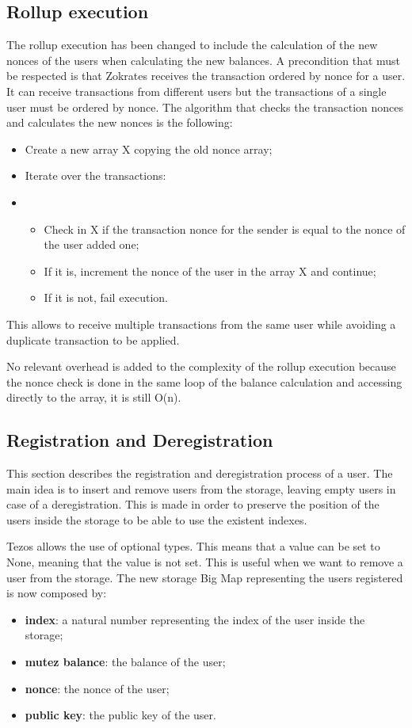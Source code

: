 \subsection{Rollup execution}

The rollup execution has been changed to include the calculation of the new nonces of the users when calculating the new balances.
A precondition that must be respected is that Zokrates receives the transaction ordered by nonce for a user. It can receive transactions from different users but the transactions of a single user must be ordered by nonce. The algorithm that checks the transaction nonces and calculates the new nonces is the following:
\begin{itemize}
	\item Create a new array X copying the old nonce array;
	\item Iterate over the transactions:
	\item \begin{itemize}
		\item Check in X if the transaction nonce for the sender is equal to the nonce of the user added one;
		\item If it is, increment the nonce of the user in the array X and continue;
		\item If it is not, fail execution.
    \end{itemize}
\end{itemize}

This allows to receive multiple transactions from the same user while avoiding a duplicate transaction to be applied.

No relevant overhead is added to the complexity of the rollup execution because the nonce check is done in the same loop of the balance calculation and accessing directly to the array, it is still O(n).



\subsection{Registration and Deregistration}

This section describes the registration and deregistration process of a user. The main idea is to insert and remove users from the storage, leaving empty users in case of a deregistration. This is made in order to preserve the position of the users inside the storage to be able to use the existent indexes.

Tezos allows the use of optional types. This means that a value can be set to None, meaning that the value is not set. This is useful when we want to remove a user from the storage. The new storage Big Map representing the users registered is now composed by:
\begin{itemize}
	\item \textbf{index}: a natural number representing the index of the user inside the storage;
	\item \textbf{mutez balance}: the balance of the user;
	\item \textbf{nonce}: the nonce of the user;
	\item \textbf{public key}: the public key of the user.
\end{itemize}

